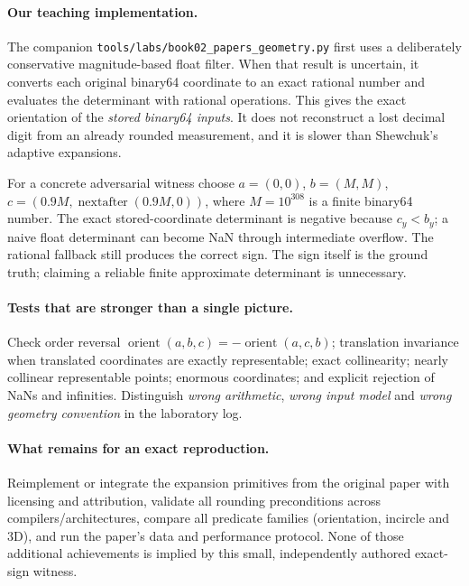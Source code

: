 \paragraph{Our teaching implementation.}
The companion \nolinkurl{tools/labs/book02_papers_geometry.py} first
uses a deliberately conservative magnitude-based float filter.
When that result is uncertain, it converts each original binary64
coordinate to an exact rational number and evaluates the determinant
with rational operations. This gives the exact orientation of the
\emph{stored binary64 inputs}. It does not reconstruct a lost decimal
digit from an already rounded measurement, and it is slower than
Shewchuk's adaptive expansions.

For a concrete adversarial witness choose \(a=(0,0)\),
\(b=(M,M)\), \(c=(0.9M,\operatorname{nextafter}(0.9M,0))\),
where \(M=10^{308}\) is a finite binary64 number.
The exact stored-coordinate determinant is negative because
\(c_y<b_y\); a naive float determinant can become NaN through
intermediate overflow. The rational fallback still produces
the correct sign. The sign itself is the ground truth;
claiming a reliable finite approximate determinant is unnecessary.

\paragraph{Tests that are stronger than a single picture.}
Check order reversal
\(\operatorname{orient}(a,b,c)=-\operatorname{orient}(a,c,b)\);
translation invariance when translated coordinates are exactly
representable; exact collinearity; nearly collinear representable
points; enormous coordinates; and explicit rejection of NaNs and
infinities. Distinguish \emph{wrong arithmetic}, \emph{wrong input
model} and \emph{wrong geometry convention} in the laboratory log.

\paragraph{What remains for an exact reproduction.}
Reimplement or integrate the expansion primitives from the original
paper with licensing and attribution, validate all rounding
preconditions across compilers/architectures, compare all predicate
families (orientation, incircle and 3D), and run the paper's data and
performance protocol. None of those additional achievements is
implied by this small, independently authored exact-sign witness.


